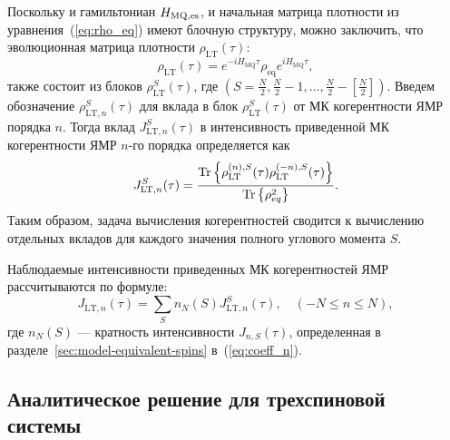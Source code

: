 Поскольку и гамильтониан $H_\mathrm{MQ,es}$, и начальная матрица плотности из уравнения~(\ref{eq:rho_eq}) имеют блочную структуру,
можно заключить,
что эволюционная матрица плотности $\rho_\mathrm{LT}(\tau)$:
%
\begin{equation}
  \label{eq:rho_eval_lt}
  \rho_\mathrm{LT} (\tau) = e^{-iH_\mathrm{MQ}\tau} \rho_\mathrm{eq} e^{iH_\mathrm{MQ}\tau},
\end{equation}
%
также состоит из блоков $\rho^S_\mathrm{LT}(\tau)$,
где $(S=\frac N 2, \frac N 2 - 1, \dots, \frac N 2 - \left[\frac N 2\right])$.
Введем обозначение $\rho^S_{\mathrm{LT}, n}(\tau)$ для
вклада в блок $\rho^S_\mathrm{LT}(\tau)$ от МК когерентности ЯМР порядка $n$.
Тогда вклад $J_{\mathrm{LT}, n}^{S}(\tau)$ в интенсивность приведенной МК когерентности ЯМР $n$-го порядка определяется как
%
\begin{equation}
    \label{eq:coherence_k_s}
    J_{\mathrm{LT}, n}^{S}(\tau) = \dfrac{\mathrm{Tr}\left\{
        \rho_\mathrm{LT}^{(n), S}(\tau)\rho_\mathrm{LT}^{(-n), S}(\tau)
    \right\}}
    {\mathrm{Tr}\left\{\rho^2_{eq}\right\}}.
\end{equation}
%
Таким образом, задача вычисления когерентностей сводится к вычислению отдельных вкладов для каждого значения полного углового момента $S$.

Наблюдаемые интенсивности приведенных МК когерентностей ЯМР рассчитываются по формуле:
%
\begin{equation}\label{eq:coherence_k}
  J_{\mathrm{LT}, n}(\tau) = \sum\limits_S n_N(S) J_{\mathrm{LT}, n}^{S}(\tau),
  \quad
  (-N\leq n \leq N),
\end{equation}
%
где $n_N(S)$ ---  кратность интенсивности $J_{n, S}(\tau)$,
определенная в разделе~\ref{sec:model-equivalent-spins} в~(\ref{eq:coeff_n}).


\subsection{Аналитическое решение для трехспиновой системы}
\label{sec:sec:nanopora-thermodynamic-equilibrium-exact_sol}

